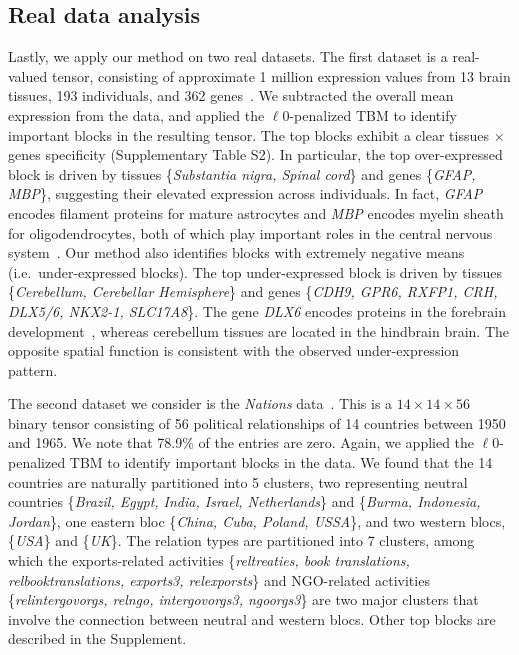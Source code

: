 \documentclass[11pt]{article}
\theoremstyle{plain}
\theoremstyle{definition}
\begin{document}
\subsection{Real data analysis}

Lastly, we apply our method on two real datasets. %
The first dataset is a real-valued tensor, consisting of approximate 1 million expression values from 13 brain tissues, 193 individuals, and 362 genes~\cite{wang2017three}. We subtracted the overall mean expression from the data, and applied the $\ell0$-penalized TBM to identify important blocks in the resulting tensor. The top blocks exhibit a clear tissues $\times$ genes specificity (Supplementary Table S2). In particular, the top over-expressed block is driven by tissues \{\emph{Substantia nigra, Spinal cord}\} and genes \{\emph{GFAP, MBP}\}, suggesting their elevated expression across individuals. In fact, \emph{GFAP} encodes filament proteins for mature astrocytes and \emph{MBP} encodes myelin sheath for oligodendrocytes, both of which play important roles in the central nervous system~\cite{o2015reference}. Our method also identifies blocks with extremely negative means (i.e.\ under-expressed blocks). The top under-expressed block is driven by tissues \{\emph{Cerebellum, Cerebellar Hemisphere}\} and genes \{\emph{CDH9, GPR6, RXFP1, CRH, DLX5/6, NKX2-1, SLC17A8}\}. The gene \emph{DLX6} encodes proteins in the forebrain development~\cite{o2015reference}, whereas cerebellum tissues are located in the hindbrain brain. The opposite spatial function is consistent with the observed under-expression pattern. 


The second dataset we consider is the \emph{Nations} data~\cite{nickel2011three}. This is a $14\times 14 \times 56$ binary tensor consisting of 56 political relationships of 14 countries between 1950 and 1965. We note that 78.9\% of the entries are zero. Again, we applied the $\ell0$-penalized TBM to identify important blocks in the data. 
We found that the 14 countries are naturally partitioned into 5 clusters, two representing neutral countries \{\emph{Brazil, Egypt, India, Israel, Netherlands}\} and \{\emph{Burma, Indonesia, Jordan}\}, one eastern bloc \{\emph{China, Cuba, Poland, USSA}\}, and two western blocs, \{\emph{USA}\} and \{\emph{UK}\}. The relation types are partitioned into 7 clusters, among which the exports-related activities \{\emph{reltreaties, book translations, relbooktranslations, exports3, relexporsts}\} and NGO-related activities \{\emph{relintergovorgs, relngo, intergovorgs3, ngoorgs3}\} are two major clusters that involve the connection between neutral and western blocs. Other top blocks are described in the Supplement. 
\end{document}
